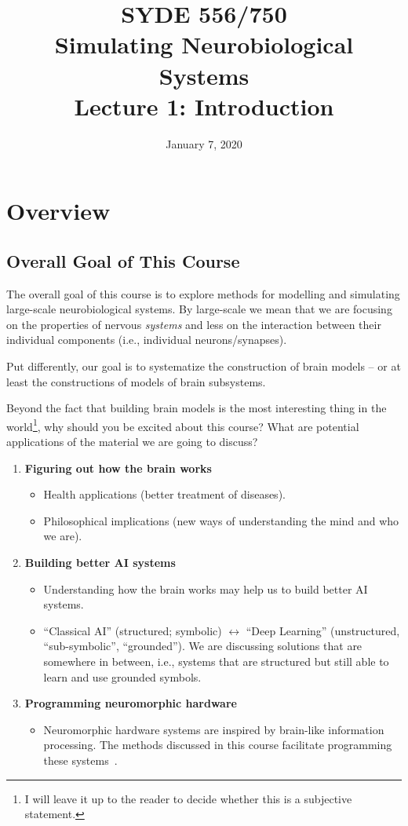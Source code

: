\documentclass[10pt,letterpaper,oneside]{article}
\date{January 7, 2020}
\title{SYDE 556/750 \\ Simulating Neurobiological Systems \\ Lecture 1: Introduction}
\begin{document}

\section{Overview}


\subsection{Overall Goal of This Course}

The overall goal of this course is to explore methods for modelling and simulating large-scale neurobiological systems. By large-scale we mean that we are focusing on the properties of nervous \emph{systems} and less on the interaction between their individual components (i.e., individual neurons/synapses).

Put differently, our goal is to systematize the construction of brain models -- or at least the constructions of models of brain subsystems.

Beyond the fact that building brain models is the most interesting thing in the world\footnote{I will leave it up to the reader to decide whether this is a subjective statement.}, why should you be excited about this course? What are potential applications of the material we are going to discuss?
\begin{enumerate}[1.]
	\item \textbf{Figuring out how the brain works}
	\begin{itemize}
		\item Health applications (better treatment of diseases).
		\item Philosophical implications (new ways of understanding the mind and who we are).
	\end{itemize}
	\item \textbf{Building better AI systems}
	\begin{itemize}
		\item Understanding how the brain works may help us to build better AI systems.
		\item \enquote{Classical AI} (structured; symbolic) $\leftrightarrow$ \enquote{Deep Learning} (unstructured, \enquote{sub-symbolic}, \enquote{grounded}). We are discussing solutions that are somewhere in between, i.e., systems that are structured but still able to learn and use grounded symbols.
	\end{itemize}
	\item \textbf{Programming neuromorphic hardware}
	\begin{itemize}
		\item Neuromorphic hardware systems are inspired by brain-like information processing. The methods discussed in this course facilitate programming these systems~\cite{boahen2017neuromorph}.
	\end{itemize}
\end{enumerate}
\end{document}
